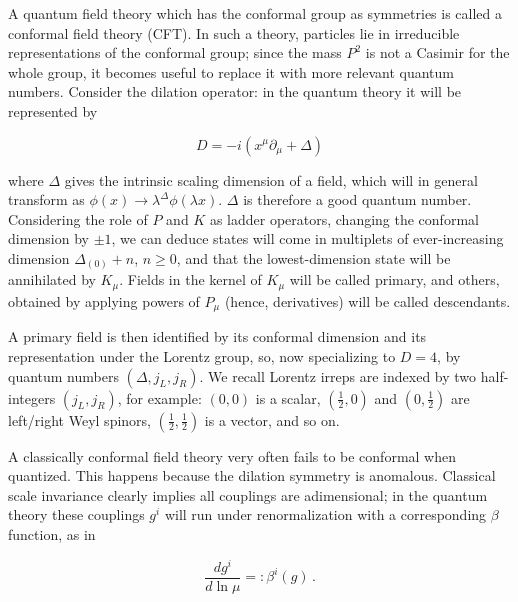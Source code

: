 A quantum field theory which has the conformal group as symmetries is called a conformal field theory (CFT). In such a theory, particles lie in irreducible representations of the conformal group; since the mass $P^2$ is not a Casimir for the whole group, it becomes useful to replace it with more relevant quantum numbers. Consider the dilation operator: in the quantum theory it will be represented by

\begin{equation}
	D = -i (x^\mu\partial_\mu + \Delta)
	\label{}
\end{equation}

where $\Delta$ gives the intrinsic scaling dimension of a field, which will in general transform as $\phi(x) \rightarrow \lambda^{\Delta} \phi(\lambda x)$. $\Delta$ is therefore a good quantum number. Considering the role of $P$ and $K$ as ladder operators, changing the conformal dimension by $\pm 1$, we can deduce states will come in multiplets of ever-increasing dimension $\Delta_{(0)} + n$, $n\geq 0$, and that the lowest-dimension state will be annihilated by $K_\mu$. Fields in the kernel of $K_\mu$ will be called primary, and others, obtained by applying powers of $P_\mu$ (hence, derivatives) will be called descendants.

A primary field is then identified by its conformal dimension and its representation under the Lorentz group, so, now specializing to $D=4$, by quantum numbers $(\Delta,j_L,j_R)$. We recall Lorentz irreps are indexed by two half-integers $(j_L,j_R)$, for example: $(0,0)$ is a scalar, $(\frac{1}{2},0)$ and $(0,\frac{1}{2})$ are left/right Weyl spinors, $(\frac{1}{2},\frac{1}{2})$ is a vector, and so on.

A classically conformal field theory very often fails to be conformal when quantized. This happens because the dilation symmetry is anomalous. Classical scale invariance clearly implies all couplings are adimensional; in the quantum theory these couplings $g^i$ will run under renormalization with a corresponding $\beta$ function, as in

\begin{equation}
	\frac{dg^i}{d\ln\mu} =: \beta^i(g)\,.
	\label{}
\end{equation}

